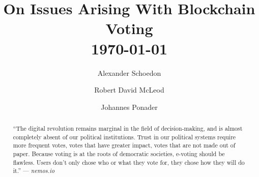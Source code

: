 \documentclass[9pt,oneside]{amsart}
\title{On Issues Arising With Blockchain Voting \\ {\smaller \today}}
\author{
    Alexander Schoedon
}
\author{
    Robert David McLeod
}
\author{
    Johannes Ponader
}
\begin{document}
\pagecolor{lightblue}

\begin{abstract}
\enquote{The digital revolution remains marginal in the field of decision-making, and is almost completely absent of our political institutions. Trust in our political systems require more frequent votes, votes that have greater impact, votes that are not made out of paper. Because voting is at the roots of democratic societies, e-voting should be flawless. Users don't only chose who or what they vote for, they chose how they will do it.} --- \textit{nemos.io} %
\end{abstract}

\maketitle

\setlength{\columnsep}{20pt}
\begin{multicols}{2}









\end{multicols}
\end{document}
